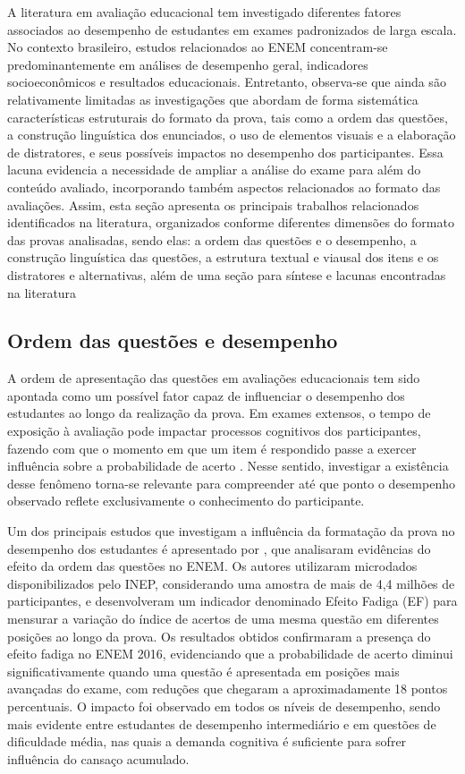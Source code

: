 \documentclass[a4paper,10pt, twocolumn]{article}
\begin{document}
A literatura em avaliação educacional tem investigado diferentes fatores associados ao desempenho de estudantes em exames padronizados de larga escala. No contexto brasileiro, estudos relacionados ao ENEM concentram-se predominantemente em análises de desempenho geral, indicadores socioeconômicos e resultados educacionais. Entretanto, observa-se que ainda são relativamente limitadas as investigações que abordam de forma sistemática características estruturais do formato da prova, tais como a ordem das questões, a construção linguística dos enunciados, o uso de elementos visuais e a elaboração de distratores, e seus possíveis impactos no desempenho dos participantes. Essa lacuna evidencia a necessidade de ampliar a análise do exame para além do conteúdo avaliado, incorporando também aspectos relacionados ao formato das avaliações. Assim, esta seção apresenta os principais trabalhos relacionados identificados na literatura, organizados conforme diferentes dimensões do formato das provas analisadas, sendo elas: a ordem das questões e o desempenho, a construção linguística das questões, a estrutura textual e viausal dos itens e os distratores e alternativas, além de uma seção para síntese e lacunas encontradas na literatura 

\subsection{Ordem das questões e desempenho}

A ordem de apresentação das questões em avaliações educacionais tem sido apontada como um possível fator capaz de influenciar o desempenho dos estudantes ao longo da realização da prova. Em exames extensos, o tempo de exposição à avaliação pode impactar processos cognitivos dos participantes, fazendo com que o momento em que um item é respondido passe a exercer influência sobre a probabilidade de acerto \cite{Barichello2022}. Nesse sentido, investigar a existência desse fenômeno torna-se relevante para compreender até que ponto o desempenho observado reflete exclusivamente o conhecimento do participante.

Um dos principais estudos que investigam a influência da formatação da prova no desempenho dos estudantes é apresentado por \textcite{Barichello2022}, que analisaram evidências do efeito da ordem das questões no ENEM. Os autores utilizaram microdados disponibilizados pelo INEP, considerando uma amostra de mais de 4,4 milhões de participantes, e desenvolveram um indicador denominado Efeito Fadiga (EF) para mensurar a variação do índice de acertos de uma mesma questão em diferentes posições ao longo da prova. Os resultados obtidos confirmaram a presença do efeito fadiga no ENEM 2016, evidenciando que a probabilidade de acerto diminui significativamente quando uma questão é apresentada em posições mais avançadas do exame, com reduções que chegaram a aproximadamente 18 pontos percentuais. O impacto foi observado em todos os níveis de desempenho, sendo mais evidente entre estudantes de desempenho intermediário e em questões de dificuldade média, nas quais a demanda cognitiva é suficiente para sofrer influência do cansaço acumulado. 
\end{document}
